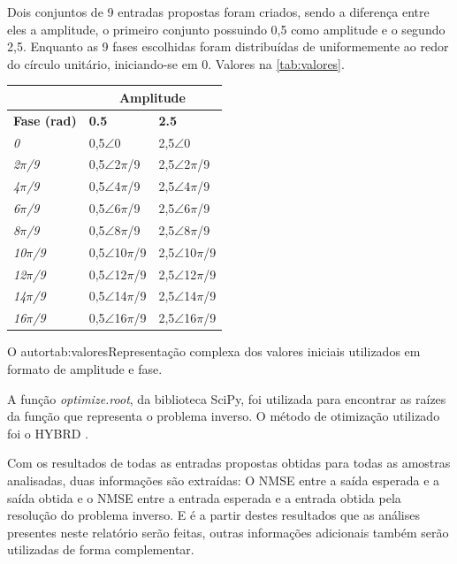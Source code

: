 Dois conjuntos de 9 entradas propostas foram criados, sendo a diferença entre eles a amplitude, o primeiro conjunto possuindo 0,5 como amplitude e o segundo 2,5. Enquanto as 9 fases escolhidas foram distribuídas de uniformemente ao redor do círculo unitário, iniciando-se em 0. Valores na \autoref{tab:valores}.
{
\begin{tabular}{l|l|l}
\hline
    & \multicolumn{2}{c}{\textbf{Amplitude}} \\ \hline
    \textbf{Fase (rad)} & \textbf{0.5} & \textbf{2.5} \\ \hline
    \textit{0}& 0,5$\angle$0 & 2,5$\angle$0 \\ \hline
    \textit{2$\pi$/9} & 0,5$\angle$2$\pi$/9  & 2,5$\angle$2$\pi$/9  \\ \hline
    \textit{4$\pi$/9} & 0,5$\angle$4$\pi$/9  & 2,5$\angle$4$\pi$/9  \\ \hline
    \textit{6$\pi$/9} & 0,5$\angle$6$\pi$/9  & 2,5$\angle$6$\pi$/9  \\ \hline
    \textit{8$\pi$/9} & 0,5$\angle$8$\pi$/9  & 2,5$\angle$8$\pi$/9  \\ \hline
    \textit{10$\pi$/9}& 0,5$\angle$10$\pi$/9 & 2,5$\angle$10$\pi$/9 \\ \hline
    \textit{12$\pi$/9}& 0,5$\angle$12$\pi$/9 & 2,5$\angle$12$\pi$/9 \\ \hline
    \textit{14$\pi$/9}& 0,5$\angle$14$\pi$/9 & 2,5$\angle$14$\pi$/9 \\ \hline
    \textit{16$\pi$/9}& 0,5$\angle$16$\pi$/9 & 2,5$\angle$16$\pi$/9 \\ \hline
\end{tabular}
\label{tab:valores}
}
{O autor}{tab:valores}{}{Representação complexa dos valores iniciais utilizados em formato de amplitude e fase.}

A função \textit{optimize.root}, da biblioteca SciPy, foi utilizada para encontrar as raízes da função que representa o problema inverso. O método de otimização utilizado foi o HYBRD \cite{powell1970hybrid}.

Com os resultados de todas as entradas propostas obtidas para todas as amostras analisadas, duas informações são extraídas: O NMSE entre a saída esperada e a saída obtida e o NMSE entre a entrada esperada e a entrada obtida pela resolução do problema inverso. E é a partir destes resultados que as análises presentes neste relatório serão feitas, outras informações adicionais também serão utilizadas de forma complementar.

